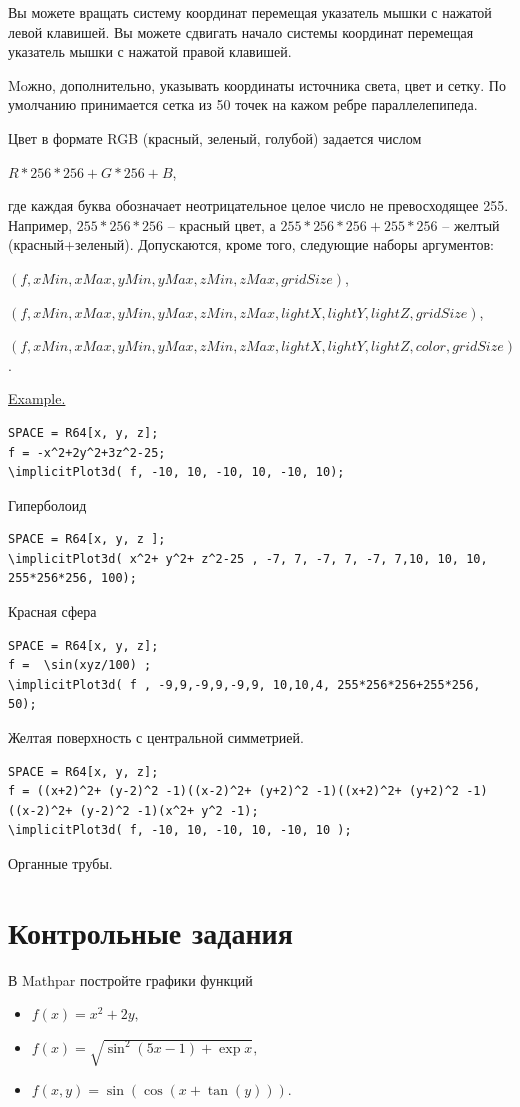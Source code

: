 Вы можете вращать систему координат перемещая указатель мышки с нажатой левой клавишей. 
Вы можете сдвигать начало системы координат перемещая указатель мышки с нажатой правой клавишей. 

Moжно, дополнительно, указывать координаты источника света, цвет и сетку. По умолчанию принимается
сетка из 50 точек на кажом ребре параллелепипеда. 

Цвет в формате RGB (красный, зеленый, голубой) задается числом

$R*256*256+G*256+B$,

 где каждая буква обозначает неотрицательное целое число не превосходящее 255.
Например, $255*256*256$ -- красный цвет, а $255*256*256+ 255*256$ -- желтый (красный+зеленый).
Допускаются, кроме того, следующие наборы аргументов: 

$(f,xMin, xMax, yMin, yMax, zMin, zMax, gridSize)$,

$(f,xMin, xMax, yMin, yMax, zMin, zMax, lightX, lightY, lightZ, gridSize )$,

$(f,xMin, xMax, yMin, yMax, zMin, zMax, lightX, lightY, lightZ, color, gridSize)$.

\underline{Example. }

\vspace*{-2mm}


\begin{verbatim}
SPACE = R64[x, y, z];
f = -x^2+2y^2+3z^2-25;
\implicitPlot3d( f, -10, 10, -10, 10, -10, 10);
\end{verbatim}

Гиперболоид

\begin{verbatim}
SPACE = R64[x, y, z ];
\implicitPlot3d( x^2+ y^2+ z^2-25 , -7, 7, -7, 7, -7, 7,10, 10, 10, 255*256*256, 100);
\end{verbatim}

Красная сфера 




\begin{verbatim}
SPACE = R64[x, y, z]; 
f =  \sin(xyz/100) ;
\implicitPlot3d( f , -9,9,-9,9,-9,9, 10,10,4, 255*256*256+255*256, 50);
\end{verbatim}

Желтая поверхность с центральной симметрией.

\begin{verbatim}
SPACE = R64[x, y, z]; 
f = ((x+2)^2+ (y-2)^2 -1)((x-2)^2+ (y+2)^2 -1)((x+2)^2+ (y+2)^2 -1) ((x-2)^2+ (y-2)^2 -1)(x^2+ y^2 -1); 
\implicitPlot3d( f, -10, 10, -10, 10, -10, 10 );
\end{verbatim}


Органные трубы.


\section{Контрольные задания}
В Mathpar постройте графики функций
\begin{itemize}
 \item $f(x)=x^2+2y, $
 \item $f(x)=\sqrt{\sin ^2(5x-1)+\exp x}, $
 \item $f(x, y) = \sin(\cos(x+\tan(y))). $
\end{itemize}

